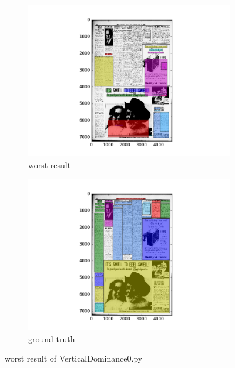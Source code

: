 \documentclass[a4paper,10pt]{article}
\begin{document}
					\begin{figure}
					\centering
					\begin{subfigure}{.5\textwidth}
					  \centering
					  \includegraphics[width=10cm]
					{VerticalDominance0.py.worst.png}
					  \caption{worst result}
					  \label{fig:sub1}
					\end{subfigure}%
					\begin{subfigure}{.5\textwidth}
					  \centering
					  \includegraphics[width=10cm]
					{VerticalDominance0.py.gt.worst.png}
					  \caption{ground truth}
					  \label{fig:sub2}
					\end{subfigure}
					\caption
					{worst result of VerticalDominance0.py}
					\label{fig:test}
					\end{figure}
						
\end{document}
